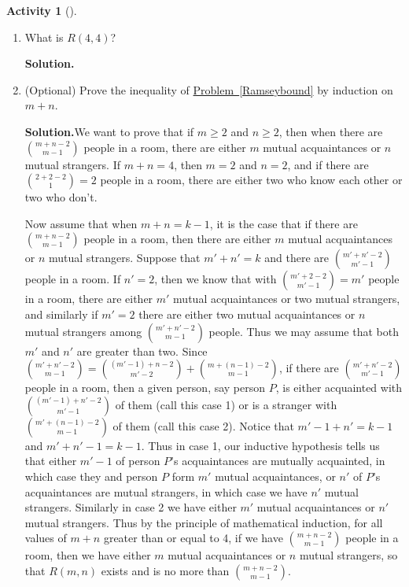 \documentclass[10pt,]{book}
\theoremstyle{plain}
\theoremstyle{definition}
\newtheorem{activity}[project]{Activity}
\numberwithin{equation}{chapter}
\begin{document}
\begin{activity}[]
\begin{enumerate}[label=(\alph*)]
~\par
\item What is \(R(4,4)\)?%
\par\medskip\noindent%
\textbf{Solution.}\quad 
~\par
\item (Optional) Prove the inequality of \hyperref[Ramseybound]{Problem~\ref{Ramseybound}} by induction on \(m+n\).%
\par\medskip\noindent%
\textbf{Solution.}\quad We want to prove that if \(m\ge 2\) and \(n\ge 2\), then when there are \(m+n-2\choose m-1\) people in a room, there are either \(m\) mutual acquaintances or \(n\) mutual strangers. If \(m+n=4\), then \(m=2\) and \(n=2\), and if there are \({2+2-2\choose1}=2\) people in a room, there are either two who know each other or two who don't.%
\par
Now assume that when \(m+n=k-1\), it is the case that if there are \(m+n-2\choose
m-1\) people in a room, then there are either \(m\) mutual acquaintances or \(n\) mutual strangers. Suppose that \(m'+n'=k\) and there are \(m'+n'-2\choose m'-1\) people in a room. If \(n'=2\), then we know that with \({m'+2-2\choose m'-1}=m'\) people in a room, there are either \(m'\) mutual acquaintances or two mutual strangers, and similarly if \(m'=2\) there are either two mutual acquaintances or \(n\) mutual strangers among \(m'+n'-2\choose m-1\) people. Thus we may assume that both \(m'\) and \(n'\) are greater than two. Since \({m'+n'-2\choose m-1}=
{(m'-1)+n-2\choose m'-2} +{m+(n-1) -2\choose m-1}\), if there are \(m'+n'-2\choose m'-1\) people in a room, then a given person, say person \(P\), is either acquainted with \((m'-1)+n'-2\choose m'-1\) of them (call this case 1) or is a stranger with \(m'+(n-1)-2\choose m-1\) of them (call this case 2). Notice that \(m'-1+n'=k-1\) and \(m'+n'-1=k-1\). Thus in case 1, our inductive hypothesis tells us that either \(m'-1\) of person \(P\)'s acquaintances are mutually acquainted, in which case they and person \(P\) form \(m'\) mutual acquaintances, or \(n'\) of \(P\)'s acquaintances are mutual strangers, in which case we have \(n'\) mutual strangers. Similarly in case 2 we have either \(m'\) mutual acquaintances or \(n'\) mutual strangers. Thus by the principle of mathematical induction, for all values of \(m+n\) greater than or equal to 4, if we have \(m+n-2\choose m-1\) people in a room, then we have either \(m\) mutual acquaintances or \(n\) mutual strangers, so that \(R(m,n)\) exists and is no more than \(m+n-2\choose m-1\).%


\end{enumerate}
\end{activity}
\end{document}
